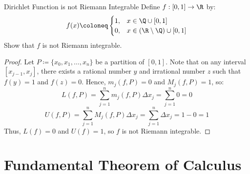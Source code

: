 \begin{exbox}{Dirichlet Function is not Riemann Integrable}{}
    Define $f : [0,1] \to \R$ by:
    \[ f(x) \coloneq \begin{cases}
        1, & x \in \Q \cup [0,1] \\
        0, & x \in (\R \setminus \Q) \cup [0,1]
    \end{cases}\] 
    Show that $f$ is not Riemann integrable.
    \tcblower
    \begin{proof}
        Let $P \coloneq \{x_0, x_1, \ldots, x_n\}$ be a partition of $[0,1]$. Note that on any interval $[x_{j-1}, x_j]$, there exists a rational number $y$ and irrational number $z$ such that $f(y) = 1$ and $f(z) = 0$. Hence, $m_j(f,P) = 0$ and $M_j(f,P) = 1$, so:
        \[ L(f,P) = \sum_{j=1}^{n} m_j(f,P) \Delta x_j = \sum_{j=1}^{n} 0 = 0 \]
        \[ U(f,P) = \sum_{j=1}^{n} M_j(f,P) \Delta x_j = \sum_{j=1}^{n} \Delta x_j = 1 - 0 = 1 \]
        Thus, $L(f) = 0$ and $U(f) = 1$, so $f$ is not Riemann integrable.
    \end{proof}
\end{exbox}

\section{Fundamental Theorem of Calculus}

